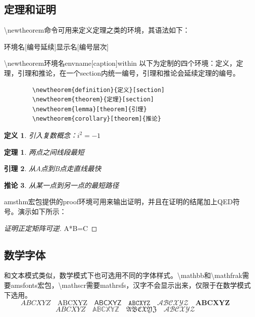 \documentclass[16pt]{article}
\begin{document}
\subsection{定理和证明}
    \textbackslash newtheorem命令可用来定义定理之类的环境，其语法如下：\par
    {环境名}[编号延续]{显示名}[编号层次] \par
    \textbackslash newtheorem{环境名envname}[caption]{within}
    以下为定制的四个环境：定义，定理，引理和推论，在一个section内统一编号，引理和推论会延续定理的编号。 \par
    \begin{lstlisting}
        \newtheorem{definition}{定义}[section]
        \newtheorem{theorem}{定理}[section]
        \newtheorem{lemma}[theorem]{引理}
        \newtheorem{corollary}[theorem]{推论}     
    \end{lstlisting} \par
    \newtheorem{definition}{定义}[section]
    \newtheorem{theorem}{定理}[section]
    \newtheorem{lemma}[theorem]{引理}
    \newtheorem{corollary}[theorem]{推论}
    
    \begin{definition}
        引入复数概念：$i^2=-1$
    \end{definition}
    \begin{theorem}
        两点之间线段最短 
    \end{theorem}
    \begin{lemma}
        从A点到B点走直线最快
    \end{lemma}
    \begin{corollary}
        从某一点到另一点的最短路径
    \end{corollary}
    amsthm宏包提供的proof环境可用来输出证明，并且在证明的结尾加上QED符号。演示如下所示： \par
    \begin{proof}[证明正定矩阵可逆]
        A*B=C
    \end{proof}

\subsection{数学字体}
    和文本模式类似，数学模式下也可选用不同的字体样式。\textbackslash mathbb和\textbackslash mathfrak需要amsfonts宏包，\textbackslash mathscr需要mathrsfs，汉字不会显示出来，仅限于在数学模式下选用。
    \[
        ABCXYZ \quad
        \mathrm{ABCXYZ} \quad
        \mathsf{ABCXYZ} \quad
        \mathtt{ABCXYZ} \quad
        \mathcal{ABCXYZ} \quad
        \mathbf{ABCXYZ} \quad
    \]
    \[
        \mathit{ABCXYZ} \quad
        \mathbb{ABCXYZ} \quad
        \mathfrak{ABCXYZ} \quad
        \mathscr{ABCXYZ} \quad
    \]
\end{document}
